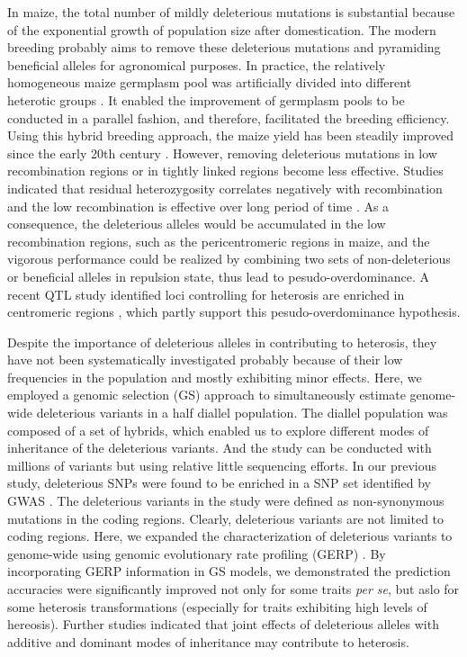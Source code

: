 \documentclass[9pt,twocolumn,twoside]{gsajnl}
\begin{document}
In maize, the total number of mildly deleterious mutations is substantial because of the exponential growth of population size after domestication. The modern breeding probably aims to remove these deleterious mutations and pyramiding beneficial alleles for agronomical purposes. In practice, the relatively homogeneous maize germplasm pool was artificially divided into different heterotic groups \citep{Heerwaarden2012}. It enabled the improvement of germplasm pools to be conducted in a parallel fashion, and therefore, facilitated the breeding efficiency. Using this hybrid breeding approach, the maize yield has been steadily improved since the early 20th century \citep{duvick2001biotechnology}. However, removing deleterious mutations in low recombination regions or in tightly linked regions become less effective. Studies indicated that residual heterozygosity correlates negatively with recombination \citep{Gore2009, McMullen2009} and the low recombination is effective over long period of time \citep{Haddrill2007}. As a consequence, the deleterious alleles would be accumulated in the low recombination regions, such as the pericentromeric regions in maize, and the vigorous performance could be realized by combining two sets of non-deleterious or beneficial alleles in repulsion state, thus lead to pesudo-overdominance. A recent QTL study identified loci controlling for heterosis are enriched in centromeric regions \citep{Lariepe2012}, which partly support this pesudo-overdominance hypothesis.

Despite the importance of deleterious alleles in contributing to heterosis, they have not been systematically investigated probably because of their low frequencies in the population and mostly exhibiting minor effects. Here, we employed a genomic selection (GS) approach to simultaneously estimate genome-wide deleterious variants in a half diallel population. The diallel population was composed of a set of hybrids, which enabled us to explore different modes of inheritance of the deleterious variants. And the study can be conducted with millions of variants but using relative little sequencing efforts. In our previous study, deleterious SNPs were found to be enriched in a SNP set identified by GWAS \citep{Mezmouk2014}. The deleterious variants in the study were defined as non-synonymous mutations in the coding regions. Clearly, deleterious variants are not limited to coding regions. Here, we expanded the characterization of deleterious variants to genome-wide using genomic evolutionary rate profiling (GERP) \citep{Cooper2005}. By incorporating GERP information in GS models, we demonstrated the prediction accuracies were significantly improved not only for some traits \emph{per se}, but aslo for some heterosis transformations (especially for traits exhibiting high levels of hereosis). Further studies indicated that joint effects of deleterious alleles with additive and dominant modes of inheritance may contribute to heterosis.
\end{document}
